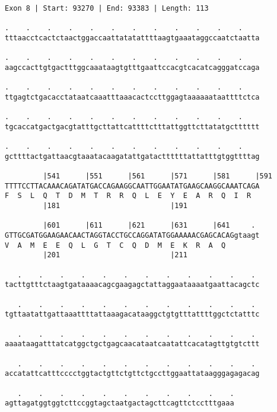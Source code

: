 \documentclass{article}
\begin{document}
\begin{Verbatim}[fontfamily=courier]
Exon 8 | Start: 93270 | End: 93383 | Length: 113

.    .    .    .    .    .    .    .    .    .    .    .    
tttaacctcactctaactggaccaattatatattttaagtgaaataggccaatctaatta

.    .    .    .    .    .    .    .    .    .    .    .    
aagccacttgtgactttggcaaataagtgtttgaattccacgtcacatcagggatccaga

.    .    .    .    .    .    .    .    .    .    .    .    
ttgagtctgacacctataatcaaatttaaacactccttggagtaaaaaataattttctca

.    .    .    .    .    .    .    .    .    .    .    .    
tgcaccatgactgacgtatttgcttattcattttctttattggttcttatatgctttttt

.    .    .    .    .    .    .    .    .    .    .    .    
gcttttactgattaacgtaaatacaagatattgatacttttttattatttgtggttttag

         |541      |551      |561      |571      |581      |591
TTTTCCTTACAAACAGATATGACCAGAAGGCAATTGGAATATGAAGCAAGGCAAATCAGA
F  S  L  Q  T  D  M  T  R  R  Q  L  E  Y  E  A  R  Q  I  R  
         |181                          |191                 

         |601      |611      |621      |631      |641     . 
GTTGCGATGGAAGAACAACTAGGTACCTGCCAGGATATGGAAAAACGAGCACAGgtaagt
V  A  M  E  E  Q  L  G  T  C  Q  D  M  E  K  R  A  Q        
         |201                          |211                 

   .    .    .    .    .    .    .    .    .    .    .    . 
tacttgtttctaagtgataaaacagcgaagagctattaggaataaaatgaattacagctc

   .    .    .    .    .    .    .    .    .    .    .    . 
tgttaatattgattaaattttattaaagacataaggctgtgtttattttggctctatttc

   .    .    .    .    .    .    .    .    .    .    .    . 
aaaataagatttatcatggctgctgagcaacataatcaatattcacatagttgtgtcttt

   .    .    .    .    .    .    .    .    .    .    .    . 
accatattcatttcccctggtactgttctgttctgccttggaattataagggagagacag

   .    .    .    .    .    .    .    .    .    .    .
agttagatggtggtcttccggtagctaatgactagcttcagttctcctttgaaa
\end{Verbatim}
\newpage
\end{document}
